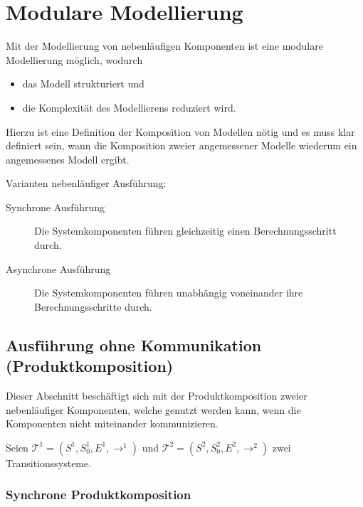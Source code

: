     \section{Modulare Modellierung}
	    Mit der Modellierung von nebenläufigen Komponenten ist eine modulare Modellierung möglich, wodurch
	    \begin{itemize}
	    	\item das Modell strukturiert und
	    	\item die Komplexität des Modellierens reduziert wird.
	    \end{itemize}
	    Hierzu ist eine Definition der Komposition von Modellen nötig und es muss klar definiert sein, wann die Komposition zweier angemessener Modelle wiederum ein angemessenes Modell ergibt.
    
	    Varianten nebenläufiger Ausführung:
	    \begin{description}
	    	\item[Synchrone Ausführung] Die Systemkomponenten führen gleichzeitig einen Berechnungsschritt durch.
	    	\item[Asynchrone Ausführung] Die Systemkomponenten führen unabhängig voneinander ihre Berechnungsschritte durch.
	    \end{description}
    
	    \subsection{Ausführung ohne Kommunikation (Produktkomposition)}
			Dieser Abschnitt beschäftigt sich mit der Produktkomposition zweier nebenläufiger Komponenten, welche genutzt werden kann, wenn die Komponenten nicht miteinander kommunizieren.

			Seien $ \mathcal{T} ^ 1 = (S ^ 1, S _ 0 ^ 1, E ^ 1, \rightarrow ^ 1) $ und $ \mathcal{T} ^ 2 = (S ^ 2, S _ 0 ^ 2, E ^ 2, \rightarrow ^ 2) $ zwei Transitionssysteme.

		    \subsubsection{Synchrone Produktkomposition}
		    
